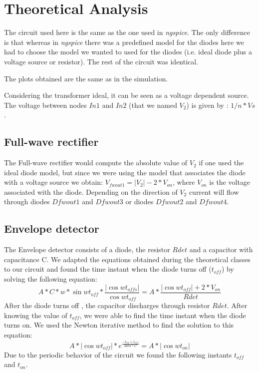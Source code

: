 \section{Theoretical Analysis}
\label{sec:analysis}



The circuit used here is the same as the one used in \textit{ngspice}. The only difference is that whereas in \textit{ngspice} there was a predefined model for the diodes here we had to choose the model we wanted to used for the diodes (i.e. ideal diode plus a voltage source or resistor). The rest of the circuit was identical.

The plots obtained are the same as in the simulation.

Considering the transformer ideal, it can be seen as a voltage dependent source. The voltage between nodes $In1$ and $In2$ (that we named $V_2$) is given by : $1/n * Vs$.

\subsection{Full-wave rectifier}
The Full-wave rectifier would  compute the  absolute value of $V_2$ if one used the ideal diode model, but since we were using the model that associates the diode with a voltage source we obtain: $V_{fwout1} = |V_2|- 2*V_{on}$, where $V_{on}$ is the voltage associated with the diode. Depending on the direction of $V_2$ current will flow through diodes $Dfwout1$ and $Dfwout3$ or diodes $Dfwout2$ and $Dfwout4$.

\subsection{Envelope detector}
The Envelope detector consists of a diode, the resistor $Rdet$ and a capacitor with capacitance C. We adapted the equations obtained during the theoretical classes to our circuit and found the time instant when the diode turns off ($t_{off}$) by solving the following equation:
\begin{equation}
  A*C*w*\sin{wt_{off}}*\frac{|\cos{wt_{offs}}|}{\cos{wt_{off}}} =  A*\frac{|\cos{wt_{off}}|+2*V_{on}}{Rdet}
\end{equation}
After the diode turns off , the capacitor discharges through resistor $Rdet$.
After knowing the value of $t_{off}$, we were able to find the time instant when the diode turns on. We used the Newton iterative method to find the solution to this equation:
\begin{equation}
   A*|\cos{wt_{off}}|*e^{\frac{-t_{on}+t_{off}}{Rdet*C}}=  A*|\cos{wt_{on}}|
\end{equation}
Due to the periodic behavior of the circuit we found the following instants $t_{off}$ and $t_{on}$.  
